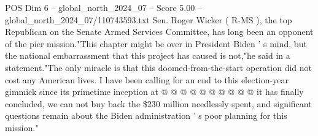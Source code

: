 \begin{textsample}{POS Dim 6 – global\_north\_2024\_07 – Score 5.00 – global\_north\_2024\_07/110743593.txt}
Sen.
Roger Wicker ( R-MS ), the top Republican on the Senate Armed Services Committee, has long been an opponent of the pier mission."This chapter might be over in President Biden ' s mind, but the national embarrassment that this project has caused is not,"he said in a statement."The only miracle is that this doomed-from-the-start operation did not cost any American lives.
I have been calling for an end to this election-year gimmick since its primetime inception at @ @ @ @ @ @ @ @ @ @ it has finally concluded, we can not buy back the \$230 million needlessly spent, and significant questions remain about the Biden administration ' s poor planning for this mission."

\end{textsample}
